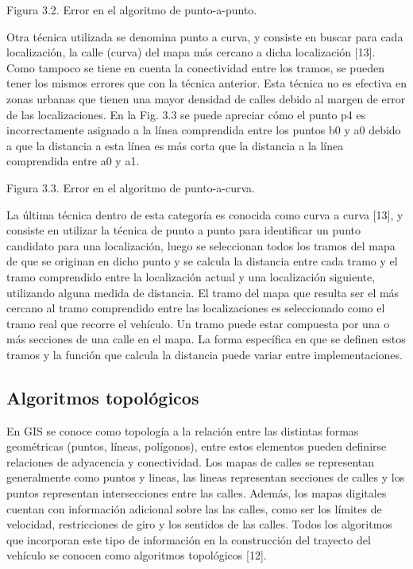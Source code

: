 \documentclass[final,fmstyle]{fpunathesis}
\begin{document}
Figura 3.2. Error en el algoritmo de punto-a-punto.

Otra técnica utilizada se denomina punto a curva, y consiste en buscar para cada localización, la calle (curva) del mapa más cercano a dicha localización [13]. Como tampoco se tiene en cuenta la conectividad entre los tramos, se pueden tener los mismos errores que con la técnica anterior. Esta técnica no es efectiva en zonas urbanas que tienen una mayor densidad de calles debido al margen de error de las localizaciones. En la Fig. 3.3 se puede apreciar cómo el punto p4 es incorrectamente asignado a  la línea comprendida entre los puntos b0 y a0 debido a que la distancia a esta línea es más corta que la distancia a la línea comprendida entre a0 y a1.

Figura 3.3. Error en el algoritmo de punto-a-curva.

La última técnica dentro de esta categoría es conocida como curva a curva [13], y consiste en  utilizar la técnica de punto a punto para identificar un punto candidato para una localización, luego se seleccionan todos los tramos del mapa de que se originan en dicho punto y se calcula la distancia entre cada tramo y el tramo comprendido entre la localización actual y una localización siguiente, utilizando alguna medida de distancia. El tramo del mapa que resulta ser el más cercano al tramo comprendido entre las localizaciones es seleccionado como el tramo real que recorre el vehículo. Un tramo puede estar compuesta por una o más secciones de una calle en el mapa. La forma específica en que se definen estos tramos y la función que calcula la distancia puede variar entre implementaciones.

\subsection{Algoritmos topológicos}

En GIS se conoce como topología a la relación entre las distintas formas geométricas (puntos, líneas, polígonos), entre estos elementos pueden definirse relaciones de adyacencia y conectividad. Los mapas de calles se representan generalmente como puntos y lineas, las lineas representan secciones de calles y los puntos representan intersecciones entre las calles. Además, los mapas digitales cuentan con información adicional sobre las las calles, como ser los límites de velocidad, restricciones de giro y los sentidos de las calles. Todos los algoritmos que incorporan este tipo de información en la construcción del trayecto del vehículo se conocen como algoritmos topológicos [12].
\end{document}
